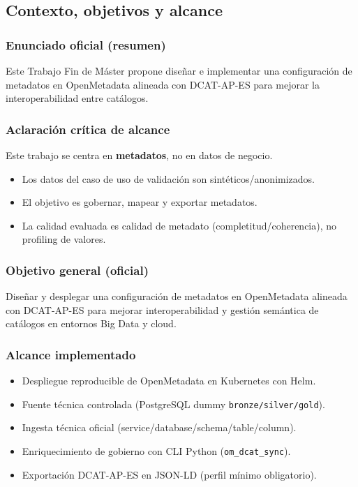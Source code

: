 \subsection{Contexto, objetivos y alcance}

\subsubsection{Enunciado oficial (resumen)}
Este Trabajo Fin de Máster propone diseñar e implementar una configuración de metadatos en OpenMetadata
alineada con DCAT-AP-ES para mejorar la interoperabilidad entre catálogos.

\subsubsection{Aclaración crítica de alcance}
Este trabajo se centra en \textbf{metadatos}, no en datos de negocio.
\begin{itemize}
  \item Los datos del caso de uso de validación son sintéticos/anonimizados.
  \item El objetivo es gobernar, mapear y exportar metadatos.
  \item La calidad evaluada es calidad de metadato (completitud/coherencia), no profiling de valores.
\end{itemize}

\subsubsection{Objetivo general (oficial)}
Diseñar y desplegar una configuración de metadatos en OpenMetadata alineada con DCAT-AP-ES para mejorar
interoperabilidad y gestión semántica de catálogos en entornos Big Data y cloud.

\subsubsection{Alcance implementado}
\begin{itemize}
  \item Despliegue reproducible de OpenMetadata en Kubernetes con Helm.
  \item Fuente técnica controlada (PostgreSQL dummy \texttt{bronze/silver/gold}).
  \item Ingesta técnica oficial (service/database/schema/table/column).
  \item Enriquecimiento de gobierno con CLI Python (\texttt{om\_dcat\_sync}).
  \item Exportación DCAT-AP-ES en JSON-LD (perfil mínimo obligatorio).
\end{itemize}

